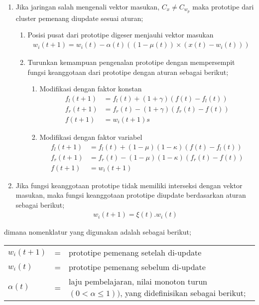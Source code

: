 \begin{enumerate}
  \item Jika jaringan salah mengenali vektor masukan, $C_x \neq C_{w_p}$ maka
  prototipe dari cluster pemenang diupdate sesuai aturan;
  \begin{enumerate}
    \item Posisi pusat dari prototipe digeser menjauhi vektor masukan
  	\begin{align}
  	w_i(t+1) = w_i(t) - \alpha(t) \left((1-\mu(t))\times(x(t) - w_i(t))  \right)
  	\end{align}
  	\item Turunkan kemampuan pengenalan prototipe dengan mempersempit fungsi
  	keanggotaan dari prototipe dengan aturan sebagai berikut;
  	\begin{enumerate}
  	  \item Modifikasi dengan faktor konstan
  	  \begin{align}
  	  f_l(t+1) &= f_l(t) + (1+\gamma) (f(t) - f_l(t)) \nonumber \\
  	  f_r(t+1) &= f_r(t) - (1+\gamma) (f_r(t) - f(t)) \nonumber \\
  	  f(t+1)   &= w_i(t+1) s
  	  \end{align}
  	  
  	  \item Modifikasi dengan faktor variabel
	  \begin{align}
  	  f_l(t+1) &= f_l(t) + (1 - \mu)(1-\kappa)(f(t) - f_l(t)) \nonumber \\
  	  f_r(t+1) &= f_r(t) - (1 - \mu)(1-\kappa)(f_r(t) - f(t)) \nonumber \\
  	  f(t+1)   &= w_i(t+1)
  	  \end{align}  	  
  	\end{enumerate}
  \end{enumerate}
  
  \item Jika fungsi keanggotaan prototipe tidak memiliki interseksi dengan
  vektor masukan, maka fungsi keanggotaan prototipe diupdate berdasarkan aturan
  sebagai berikut;
  \begin{align}
  w_i(t+1) = \xi(t).w_i(t)
  \end{align}
\end{enumerate}

\noindent dimana nomenklatur yang digunakan adalah sebagai berikut;

\begin{tabular}{llp{}}
$w_{i}(t+1)$ &=& prototipe pemenang setelah di-update  \\
$w_{i}(t)$ 	 &=& prototipe pemenang sebelum di-update \\
$\alpha(t)$  &=& laju pembelajaran, nilai monoton turun $(0 < \alpha \le 1))$,
 yang didefinisikan sebagai berikut;
\end{tabular}

